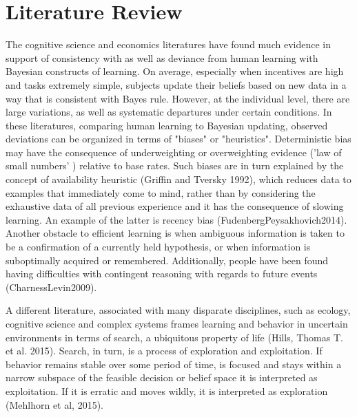 \section{Literature Review}
The cognitive science and economics literatures have found much evidence in support of consistency with as well as deviance from human learning with Bayesian constructs of learning. On average, especially when incentives are high and tasks extremely simple, subjects update their beliefs based on new data in a way that is consistent with Bayes rule. However, at the individual level, there are large variations, as well as systematic departures under certain conditions.  In these literatures, comparing human learning to Bayesian updating, observed deviations can be organized in terms of "biases" or "heuristics".  Deterministic bias may have the consequence of underweighting or overweighting evidence ('law of small numbers' ) relative to base rates.  Such biases are in turn explained by the concept of availability heuristic (Griffin and Tversky 1992), which reduces data to examples that immediately come to mind, rather than by considering the exhaustive data of all previous experience and it has the consequence of slowing learning.  An example of the latter is recency bias (FudenbergPeysakhovich2014).  Another obstacle to efficient learning is when ambiguous information is taken to be a confirmation of a currently held hypothesis, or when information is suboptimally acquired or remembered.  Additionally, people have been found having difficulties with contingent reasoning with regards to future events (CharnessLevin2009). 
 
A different literature, associated with many disparate disciplines, such as ecology, cognitive science and complex systems frames learning and behavior in uncertain environments in terms of search, a ubiquitous property of life (Hills, Thomas T. et al. 2015).  Search, in turn, is a process of exploration and exploitation.  If behavior remains stable over some period of time, is focused and stays within a narrow subspace of the feasible decision or belief space it is interpreted as exploitation.  If it is erratic and moves wildly, it is interpreted as exploration (Mehlhorn et al, 2015).   


